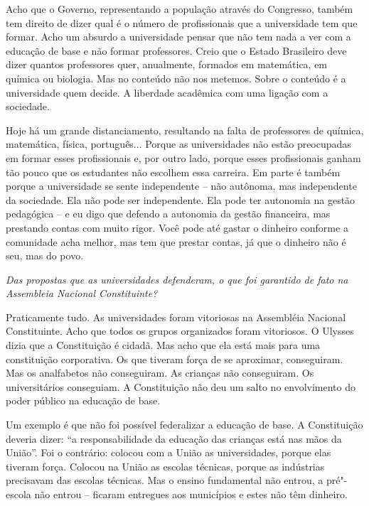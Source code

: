 Acho que o Governo, representando a população através do Congresso,
também tem direito de dizer qual é o número de profissionais que a
universidade tem que formar. Acho um absurdo a universidade pensar que
não tem nada a ver com a educação de base e não formar professores.
Creio que o Estado Brasileiro deve dizer quantos professores quer,
anualmente, formados em matemática, em química ou biologia. Mas no
conteúdo não nos metemos. Sobre o conteúdo é a universidade quem decide.
A liberdade acadêmica com uma ligação com a sociedade.

Hoje há um grande distanciamento, resultando na falta de professores de
química, matemática, física, português... Porque as universidades não
estão preocupadas em formar esses profissionais e, por outro lado,
porque esses profissionais ganham tão pouco que os estudantes não
escolhem essa carreira. Em parte é também porque a universidade se sente
independente -- não autônoma, mas independente da sociedade. Ela não
pode ser independente. Ela pode ter autonomia na gestão pedagógica -- e
eu digo que defendo a autonomia da gestão financeira, mas prestando
contas com muito rigor. Você pode até gastar o dinheiro conforme a
comunidade acha melhor, mas tem que prestar contas, já que o dinheiro
não é seu, mas do povo.

\medskip

\noindent\emph{Das propostas que as universidades defenderam, o que foi
garantido de fato na Assembleia Nacional Constituinte?}

Praticamente tudo. As universidades foram vitoriosas
na Assembléia Nacional Constituinte. Acho que todos os grupos
organizados foram vitoriosos. O Ulysses dizia que a Constituição é
cidadã. Mas acho que ela está mais para uma constituição corporativa. Os
que tiveram força de se aproximar, conseguiram. Mas os analfabetos não
conseguiram. As crianças não conseguiram. Os universitários conseguiam.
A Constituição não deu um salto no envolvimento do poder público na
educação de base.

Um exemplo é que não foi possível federalizar a educação de base. A
Constituição deveria dizer: ``a responsabilidade da educação das
crianças está nas mãos da União''. Foi o contrário: colocou com a União
as universidades, porque elas tiveram força. Colocou na União as escolas
técnicas, porque as indústrias precisavam das escolas técnicas. Mas o
ensino fundamental não entrou, a pré"-escola não entrou -- ficaram
entregues aos municípios e estes não têm dinheiro.

\medskip

